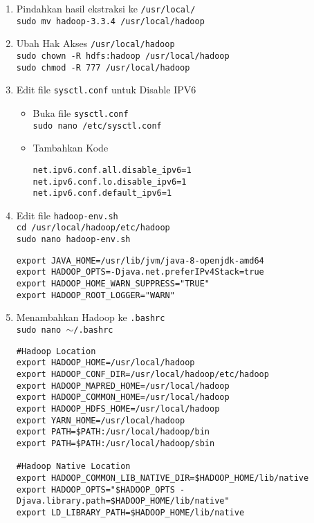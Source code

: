 \documentclass[a4paper]{tufte-handout}
\begin{document}
\begin{enumerate}
\item Pindahkan hasil ekstraksi ke {\tt /usr/local/} \\
{\tt sudo mv hadoop-3.3.4 /usr/local/hadoop}

\item Ubah Hak Akses {\tt /usr/local/hadoop} \\
{\tt sudo chown -R hdfs:hadoop /usr/local/hadoop} \\
{\tt sudo chmod -R 777 /usr/local/hadoop}

\item Edit file {\tt sysctl.conf} untuk Disable IPV6
\begin{itemize}
\item Buka file {\tt sysctl.conf} \\
{\tt sudo nano /etc/sysctl.conf}
\item Tambahkan Kode
\begin{lstlisting}
net.ipv6.conf.all.disable_ipv6=1
net.ipv6.conf.lo.disable_ipv6=1
net.ipv6.conf.default_ipv6=1
\end{lstlisting}
\end{itemize}

\item Edit file {\tt hadoop-env.sh} \\
{\tt cd /usr/local/hadoop/etc/hadoop} \\
{\tt sudo nano hadoop-env.sh} \\

\begin{lstlisting}
export JAVA_HOME=/usr/lib/jvm/java-8-openjdk-amd64
export HADOOP_OPTS=-Djava.net.preferIPv4Stack=true
export HADOOP_HOME_WARN_SUPPRESS="TRUE"
export HADOOP_ROOT_LOGGER="WARN"
\end{lstlisting}

\item Menambahkan Hadoop ke {\tt .bashrc} \\
{\tt sudo nano $\sim$/.bashrc} \\
\begin{lstlisting}
#Hadoop Location
export HADOOP_HOME=/usr/local/hadoop
export HADOOP_CONF_DIR=/usr/local/hadoop/etc/hadoop
export HADOOP_MAPRED_HOME=/usr/local/hadoop
export HADOOP_COMMON_HOME=/usr/local/hadoop
export HADOOP_HDFS_HOME=/usr/local/hadoop
export YARN_HOME=/usr/local/hadoop
export PATH=$PATH:/usr/local/hadoop/bin
export PATH=$PATH:/usr/local/hadoop/sbin

#Hadoop Native Location
export HADOOP_COMMON_LIB_NATIVE_DIR=$HADOOP_HOME/lib/native
export HADOOP_OPTS="$HADOOP_OPTS -Djava.library.path=$HADOOP_HOME/lib/native"
export LD_LIBRARY_PATH=$HADOOP_HOME/lib/native
\end{lstlisting}


\end{enumerate}
\end{document}
